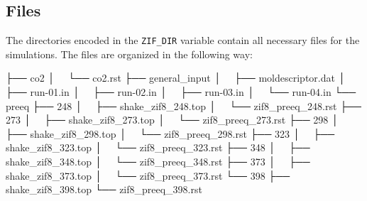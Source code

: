 \documentclass[
  letterpaper,
]{article}
\newenvironment{Shaded}{\begin{snugshade}}{\end{snugshade}}
\newcommand{\ExtensionTok}[1]{\textcolor[rgb]{0.00,0.23,0.31}{#1}}
\newcommand{\NormalTok}[1]{\textcolor[rgb]{0.00,0.23,0.31}{#1}}
\begin{document}
\hypertarget{files}{%
\subsection*{Files}\label{files}}


The directories encoded in the \texttt{ZIF\_DIR} variable contain all
necessary files for the simulations. The files are organized in the
following way:

\begin{tcolorbox}[enhanced jigsaw, toptitle=1mm, opacitybacktitle=0.6, colframe=quarto-callout-note-color-frame, toprule=.15mm, breakable, bottomrule=.15mm, left=2mm, title=\textcolor{quarto-callout-note-color}{\faInfo}\hspace{0.5em}{Note}, titlerule=0mm, leftrule=.75mm, bottomtitle=1mm, coltitle=black, arc=.35mm, rightrule=.15mm, opacityback=0, colback=white, colbacktitle=quarto-callout-note-color!10!white]

\begin{Shaded}
\begin{Highlighting}[]
\ExtensionTok{├──}\NormalTok{ co2}
\ExtensionTok{│  }\NormalTok{ └── co2.rst}
\ExtensionTok{├──}\NormalTok{ general\_input}
\ExtensionTok{│  }\NormalTok{ ├── moldescriptor.dat}
\ExtensionTok{│  }\NormalTok{ ├── run{-}01.in}
\ExtensionTok{│  }\NormalTok{ ├── run{-}02.in}
\ExtensionTok{│  }\NormalTok{ ├── run{-}03.in}
\ExtensionTok{│  }\NormalTok{ └── run{-}04.in}
\ExtensionTok{└──}\NormalTok{ preeq}
    \ExtensionTok{├──}\NormalTok{ 248}
    \ExtensionTok{│  }\NormalTok{ ├── shake\_zif8\_248.top}
    \ExtensionTok{│  }\NormalTok{ └── zif8\_preeq\_248.rst}
    \ExtensionTok{├──}\NormalTok{ 273}
    \ExtensionTok{│  }\NormalTok{ ├── shake\_zif8\_273.top}
    \ExtensionTok{│  }\NormalTok{ └── zif8\_preeq\_273.rst}
    \ExtensionTok{├──}\NormalTok{ 298}
    \ExtensionTok{│  }\NormalTok{ ├── shake\_zif8\_298.top}
    \ExtensionTok{│  }\NormalTok{ └── zif8\_preeq\_298.rst}
    \ExtensionTok{├──}\NormalTok{ 323}
    \ExtensionTok{│  }\NormalTok{ ├── shake\_zif8\_323.top}
    \ExtensionTok{│  }\NormalTok{ └── zif8\_preeq\_323.rst}
    \ExtensionTok{├──}\NormalTok{ 348}
    \ExtensionTok{│  }\NormalTok{ ├── shake\_zif8\_348.top}
    \ExtensionTok{│  }\NormalTok{ └── zif8\_preeq\_348.rst}
    \ExtensionTok{├──}\NormalTok{ 373}
    \ExtensionTok{│  }\NormalTok{ ├── shake\_zif8\_373.top}
    \ExtensionTok{│  }\NormalTok{ └── zif8\_preeq\_373.rst}
    \ExtensionTok{└──}\NormalTok{ 398}
        \ExtensionTok{├──}\NormalTok{ shake\_zif8\_398.top}
        \ExtensionTok{└──}\NormalTok{ zif8\_preeq\_398.rst}
\end{Highlighting}
\end{Shaded}

\end{tcolorbox}
\end{document}
